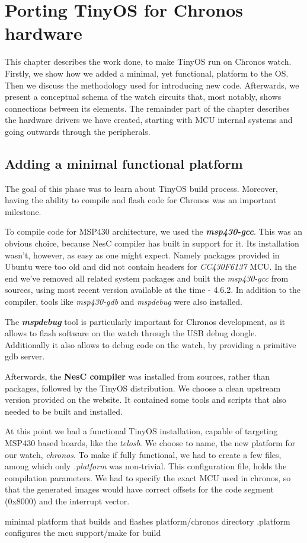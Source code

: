\chapter{Porting TinyOS for Chronos hardware}

This chapter describes the work done, to make TinyOS run on Chronos
watch. Firstly, we show how we added a minimal, yet functional,
platform to the OS. Then we discuss the methodology used for
introducing new code. Afterwards, we present a conceptual schema of
the watch circuits that, most notably, shows connections between its
elements. The remainder part of the chapter describes the hardware
drivers we have created, starting with MCU internal systems and going
outwards through the peripherals.

\section{Adding a minimal functional platform}

The goal of this phase was to learn about TinyOS build process.
Moreover, having the ability to compile and flash code for Chronos was
an important milestone.

To compile code for MSP430 architecture, we used the
\emph{\bf msp430-gcc}. This was an obvious choice, because NesC compiler
has built in support for it. Its installation wasn't, however, as easy
as one might expect. Namely packages provided in Ubuntu were too old
and did not contain headers for \emph{CC430F6137} MCU. In the end
we've removed all related system packages and built the \emph{msp430-gcc}
from sources, using most recent version available at the time - 4.6.2.
In addition to the compiler, tools like \emph{msp430-gdb} and
\emph{mspdebug} were also installed.

The \emph{\bf mspdebug} tool is particularly important for Chronos development,
as it allows to flash software on the watch through the USB debug dongle.
Additionally it also allows to debug code on the watch, by providing a
primitive gdb server.

Afterwards, the {\bf NesC compiler} was installed from sources, rather than
packages, followed by the TinyOS distribution. We choose a clean upstream
version provided on the website. It contained some tools and scripts that
also needed to be built and installed.

At this point we had a functional TinyOS installation, capable of
targeting MSP430 based boards, like the \emph{telosb}. We choose to
name, the new platform for our watch, \emph{chronos}. To make if fully
functional, we had to create a few files, among which only
\emph{.platform} was non-trivial. This configuration file, holds the
compilation parameters. We had to specify the exact MCU used in
chronos, so that the generated images would have correct offsets for
the code segment (0x8000) and the interrupt vector.



  minimal platform that builds and flashes
    platform/chronos directory
      .platform configures the mcu
    support/make for build

